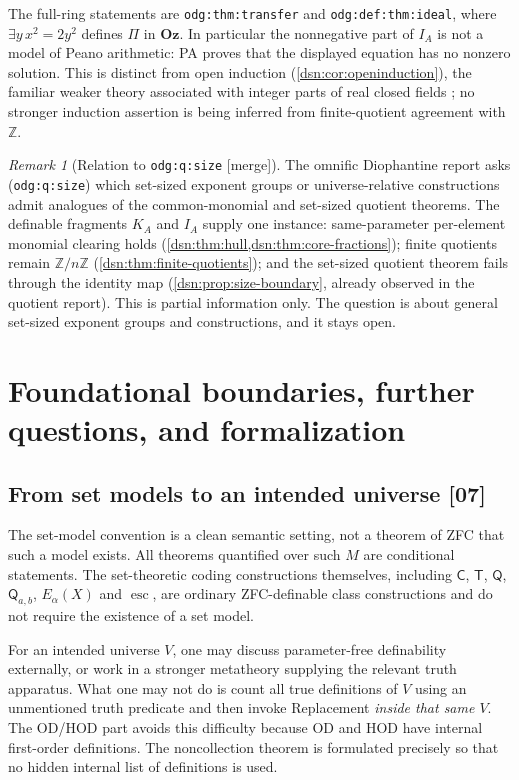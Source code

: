 \documentclass[11pt,a4paper]{article}
\numberwithin{equation}{section}
\theoremstyle{definition}
\theoremstyle{remark}
\newtheorem{remark}[remark]{Remark}
\newcommand{\Oz}{\mathbf{Oz}}
\newcommand{\OD}{\mathrm{OD}}
\newcommand{\HOD}{\mathrm{HOD}}
\newcommand{\Z}{\mathbb Z}
\newcommand{\Code}{\mathsf C}
\newcommand{\Two}{\mathsf T}
\newcommand{\Mc}{\mathsf Q}
\newcommand{\esc}{\operatorname{esc}}
\newcommand{\src}[1]{\textup{\textsf{\small[#1]}}}
\newcommand{\mergetag}{\textup{\textsf{\small[merge]}}}
\newcommand{\lbl}[1]{\nolinkurl{#1}}
\begin{document}
The full-ring statements are \lbl{odg:thm:transfer} and
\lbl{odg:def:thm:ideal}, where $\exists y\,x^2=2y^2$ defines $\Pi$ in
$\Oz$. In particular the nonnegative part of $I_A$ is not a model of Peano
arithmetic: PA proves that the displayed equation has no nonzero solution.
This is distinct from open induction (\cref{dsn:cor:openinduction}), the
familiar weaker theory associated with integer parts of real closed fields
\cite{Shepherdson}; no stronger induction assertion is being inferred from
finite-quotient agreement with $\Z$.

\begin{remark}[Relation to \lbl{odg:q:size} \mergetag]\label{dsn:rem:size}
The omnific Diophantine report asks (\lbl{odg:q:size}) which set-sized
exponent groups or universe-relative constructions admit analogues of the
common-monomial and set-sized quotient theorems. The definable fragments
$K_A$ and $I_A$ supply one instance: same-parameter per-element monomial
clearing holds (\cref{dsn:thm:hull,dsn:thm:core-fractions}); finite
quotients remain $\Z/n\Z$ (\cref{dsn:thm:finite-quotients}); and the
set-sized quotient theorem fails through the identity map
(\cref{dsn:prop:size-boundary}, already observed in the quotient report).
This is partial information only. The question is about general set-sized
exponent groups and constructions, and it stays open.
\end{remark}

\section{Foundational boundaries, further questions, and formalization}
\label{dsn:sec:questions}

\subsection{From set models to an intended universe \src{07}}

The set-model convention is a clean semantic setting, not a theorem of ZFC
that such a model exists. All theorems quantified over such $M$ are
conditional statements. The set-theoretic coding constructions themselves,
including $\Code$, $\Two$, $\Mc$, $\Mc_{a,b}$, $E_\alpha(X)$ and $\esc$, are
ordinary ZFC-definable class constructions and do not require the existence
of a set model.

For an intended universe $V$, one may discuss parameter-free definability
externally, or work in a stronger metatheory supplying the relevant truth
apparatus. What one may not do is count all true definitions of $V$ using
an unmentioned truth predicate and then invoke Replacement \emph{inside
that same $V$}. The $\OD$/$\HOD$ part avoids this difficulty because $\OD$
and $\HOD$ have internal first-order definitions. The noncollection theorem
is formulated precisely so that no hidden internal list of definitions is
used.
\end{document}
